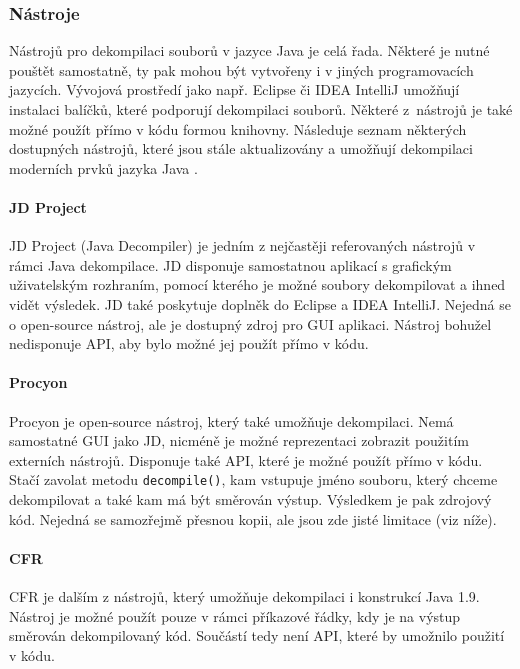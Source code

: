 			\subsubsection{Nástroje}
				Nástrojů pro dekompilaci souborů v jazyce Java je celá řada. Některé je nutné pouštět samostatně, ty pak mohou být vytvořeny i v jiných programovacích jazycích. Vývojová prostředí jako např. Eclipse či IDEA IntelliJ umožňují instalaci balíčků, které podporují dekompilaci souborů. Některé z~nástrojů je také možné použít přímo v kódu formou knihovny. Následuje seznam některých dostupných nástrojů, které jsou stále aktualizovány a umožňují dekompilaci moderních prvků jazyka Java \cite{top8decompilers}\cite{decompilersOnline}\cite{quickDecompilers}.	
				
				\paragraph{JD Project}
					JD Project (Java Decompiler) \cite{jd} je jedním z nejčastěji referovaných nástrojů v rámci Java dekompilace. JD disponuje samostatnou aplikací s grafickým uživatelským rozhraním, pomocí kterého je možné soubory dekompilovat a ihned vidět výsledek. JD také poskytuje doplněk do Eclipse a IDEA IntelliJ. Nejedná se o open-source nástroj, ale je dostupný zdroj pro GUI aplikaci. Nástroj bohužel nedisponuje API, aby bylo možné jej použít přímo v kódu.
					
				\paragraph{Procyon}
					Procyon \cite{procyon} je open-source nástroj, který také umožňuje dekompilaci. Nemá samostatné GUI jako JD, nicméně je možné reprezentaci zobrazit použitím externích nástrojů. Disponuje také API, které je možné použít přímo v kódu. Stačí zavolat metodu \texttt{decompile()}, kam vstupuje jméno souboru, který chceme dekompilovat a také kam má být směrován výstup. Výsledkem je pak zdrojový kód. Nejedná se samozřejmě přesnou kopii, ale jsou zde jisté limitace (viz níže).
					
				\paragraph{CFR}
					CFR \cite{cfr} je dalším z nástrojů, který umožňuje dekompilaci i konstrukcí Java 1.9. Nástroj je možné použít pouze v rámci příkazové řádky, kdy je na výstup směrován dekompilovaný kód. Součástí tedy není API, které by umožnilo použití v kódu.\\
					
